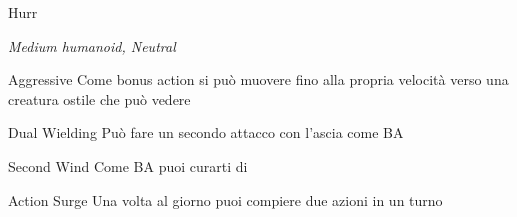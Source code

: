 \documentclass[10pt,twoside, twocolumn, openany]{dndbook}
\begin{document}
\begin{DndMonster}{Hurr}%
  \begin{hangingpar}
    \textit{Medium humanoid, Neutral}
  \end{hangingpar}
  \DndMonsterBasics[%
  armorclass = 14,
  hitpoints  = \DndDice{3d10 + 6},
  speed      = {30 ft.},
  ]
  \DndMonsterAbilityScores[
      str = 16, 
      dex = 12,
      con = 16,
      int = 10,
      wis = 13,
      cha = 8,
  ]
  \DndMonsterDetails[
    skills = {Atlethics +5, Intimidation +2, Survival +3},
    senses = {darkvision 60 ft., passive Perception 11},
    languages = {Common, Orchish},
    challenge = {Calcolare},
  ]
  \begin{DndMonsterAction}{Aggressive}
    Come bonus action si può muovere fino alla propria velocità verso una creatura ostile che può vedere
  \end{DndMonsterAction}
  \begin{DndMonsterAction}{Dual Wielding}
    Può fare un secondo attacco con l'ascia come BA
  \end{DndMonsterAction}
  \begin{DndMonsterAction}{Second Wind}
    Come BA puoi curarti di 
  \end{DndMonsterAction}
  \begin{DndMonsterAction}{Action Surge}
    Una volta al giorno puoi compiere due azioni in un turno
  \end{DndMonsterAction}
  

  \DndMonsterMelee[
    name=Handaxe,
    mod=+5,
    reach=5,
    targets=one target,
    dmg=\DndDice{1d6+3},
    dmg-type = Slashing,
  ]
  \DndMonsterRanged[
    name=Handaxe (thrown),
    mod=+5,
    reach=20/60,
    targets=one target,
    dmg=\DndDice{1d6+3},
    dmg-type = Slashing,
  ]
\end{DndMonster}
\end{document}
